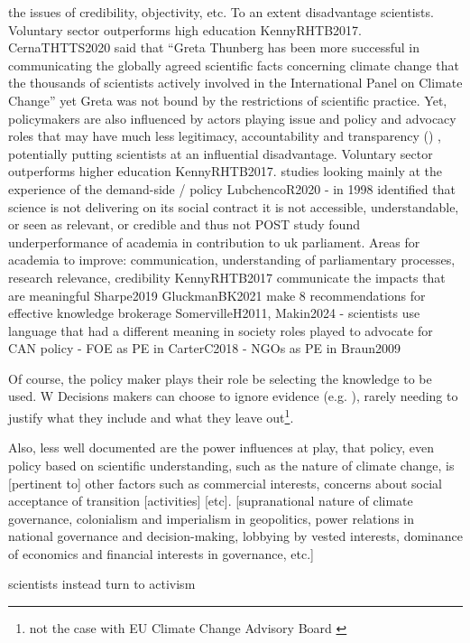 the issues of credibility, objectivity, etc. To an extent disadvantage scientists. Voluntary sector outperforms high education KennyRHTB2017. CernaTHTTS2020 said that ``Greta Thunberg has been more successful in communicating the globally agreed scientific facts concerning climate change that the thousands of scientists actively involved in the International Panel on Climate Change'' yet Greta was not bound by the restrictions of scientific practice. Yet, policymakers are also influenced by actors playing issue and policy and advocacy roles that may have much less legitimacy, accountability and transparency (\cite{Kingdon1993,Knaggard2015,Cairney2018,vonMalmborg2024strategies}) , potentially putting scientists at an influential disadvantage. Voluntary sector outperforms higher education KennyRHTB2017. studies looking mainly at the experience of the demand-side / policy
LubchencoR2020 - in 1998 identified that science is not delivering on its social contract it is not accessible, understandable, or seen as relevant, or credible and thus not 
POST study found underperformance of academia in contribution to uk parliament. Areas for academia to improve: communication, understanding of parliamentary processes, research relevance, credibility KennyRHTB2017  
communicate the impacts that are meaningful Sharpe2019
GluckmanBK2021 make 8 recommendations for effective knowledge brokerage
SomervilleH2011, Makin2024 - scientists use language that had a different meaning in society 
roles played to advocate for CAN policy - FOE as PE in CarterC2018 - NGOs as PE in Braun2009

Of course, the policy maker plays their role be selecting the knowledge to be used. W  Decisions makers can choose to ignore evidence (e.g. \cite{TennoyHLN2016}), rarely needing to justify what they include and what they leave out\footnote{not the case with EU Climate Change Advisory Board \cite{WardmanE2023}}.


Also, less well documented are the power influences at play, that policy, even policy based on scientific understanding, such as the nature of climate change, is [pertinent to] other factors such as commercial interests, concerns about social acceptance of transition [activities] [etc]. [supranational nature of climate governance, colonialism and imperialism in geopolitics, power relations in national governance and decision-making, lobbying by vested interests, dominance of economics and financial interests in governance, etc.]

scientists instead turn to activism \cite{Pivovarchuk2024,GregoryBW2024}


